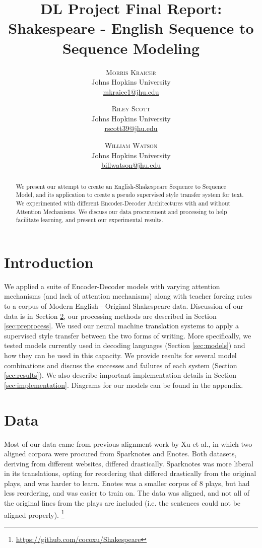 \documentclass[twoside,twocolumn]{article}
\title{DL Project Final Report:\\
       Shakespeare - English Sequence to Sequence Modeling}
\author{%
\textsc{Morris Kraicer} \\[1ex]
\normalsize Johns Hopkins University \\
\normalsize \href{mailto:mkraice1@jhu.edu}{mkraice1@jhu.edu}
 \and
 \textsc{Riley Scott} \\[1ex]
\normalsize Johns Hopkins University \\
\normalsize \href{mailto:rscott39@jhu.edu}{rscott39@jhu.edu}
 \and
  \textsc{William Watson} \\[1ex]
\normalsize Johns Hopkins University \\
\normalsize \href{mailto:billwatson@jhu.edu}{billwatson@jhu.edu}
}
\date{}%
\begin{document}
\maketitle



\begin{abstract}
\noindent
We present our attempt to create an English-Shakespeare Sequence to Sequence
Model, and its application to create a pseudo supervised style transfer system
for text. We experimented with different Encoder-Decoder Architectures with and
without Attention Mechanisms. We discuss our data procurement and processing
to help facilitate learning, and present our experimental results.
\end{abstract}

\section{Introduction}
We applied a suite of Encoder-Decoder models with varying attention
mechanisms (and lack of attention mechanisms) along with teacher forcing rates
to a corpus of Modern English - Original Shakespeare data. Discussion of our
data is in Section \ref{sec:data},
our processing methods are described in Section \ref{sec:preprocess}.
We used our neural machine translation systems to
apply a supervised style transfer between the two forms of writing.
More specifically, we tested models currently
used in decoding languages (Section \ref{sec:models}) and how they can
be used in this capacity. We provide results for several model
combinations and discuss the successes and failures of each system
(Section \ref{sec:results}). We also describe important implementation details
in Section \ref{sec:implementation}.
Diagrams for our models can be found in the appendix.
\section{Data}
\label{sec:data}
Most of our data came from previous alignment work
by Xu et al.\cite{xu2012paraphrasing}, in which
two aligned corpora were procured from Sparknotes and Enotes. Both datasets,
deriving from different websites, differed drastically. Sparknotes was more
liberal in its translations, opting for reordering that differed drastically
from the original plays, and was harder to learn. Enotes was a smaller corpus
of 8 plays, but had less reordering, and was easier to train on.
The data was aligned, and not all of the original lines
from the plays are included (i.e. the sentences could not be aligned properly).
\footnote{\url{https://github.com/cocoxu/Shakespeare}}
\end{document}
